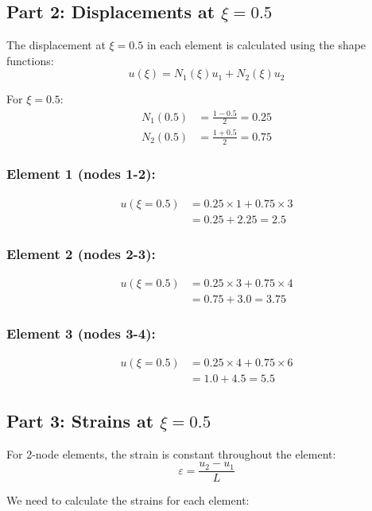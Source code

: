 \documentclass[12pt,a4paper]{article}
\begin{document}
\subsection{Part 2: Displacements at $\xi = 0.5$}
The displacement at $\xi = 0.5$ in each element is calculated using the shape functions:
\begin{equation}
u(\xi) = N_1(\xi)u_1 + N_2(\xi)u_2
\end{equation}

For $\xi = 0.5$:
\begin{align}
N_1(0.5) &= \frac{1-0.5}{2} = 0.25 \\
N_2(0.5) &= \frac{1+0.5}{2} = 0.75
\end{align}

\subsubsection*{Element 1 (nodes 1-2):}
\begin{align}
u(\xi=0.5) &= 0.25 \times 1 + 0.75 \times 3 \\
&= 0.25 + 2.25 = 2.5
\end{align}

\subsubsection*{Element 2 (nodes 2-3):}
\begin{align}
u(\xi=0.5) &= 0.25 \times 3 + 0.75 \times 4 \\
&= 0.75 + 3.0 = 3.75
\end{align}

\subsubsection*{Element 3 (nodes 3-4):}
\begin{align}
u(\xi=0.5) &= 0.25 \times 4 + 0.75 \times 6 \\
&= 1.0 + 4.5 = 5.5
\end{align}

\subsection{Part 3: Strains at $\xi = 0.5$}
For 2-node elements, the strain is constant throughout the element:
\begin{equation}
\varepsilon = \frac{u_2 - u_1}{L}
\end{equation}

We need to calculate the strains for each element:
\end{document}
